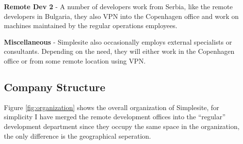 \begin{itemize*}
    \item \textbf{Remote Dev 2} - A number of developers work from
          Serbia, like the remote developers in Bulgaria, they also VPN into the
          Copenhagen office and work on machines maintained by the regular
          operations employees.

    \item \textbf{Miscellaneous} - Simplesite also occasionally employs external
          specialists or consultants. Depending on the need, they will either
          work in the Copenhagen office or from some remote location using VPN.
\end{itemize*}


\subsection{Company Structure}

Figure \ref{fig:organization} shows the overall organization of Simplesite, for
simplicity I have merged the remote development offices into the ``regular''
development department since they occupy the same space in the organization, the
only difference is the geographical seperation.

\begin{landscape}
\end{landscape}